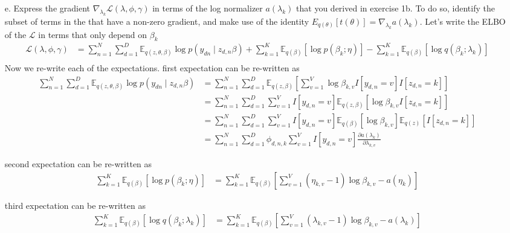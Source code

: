 \documentclass [12pt]{article}
\newcommand{\E}{\ensuremath{\mathbb{E}}}
\begin{document}
\begin{itemize}
\item[e.] Express the gradient $\nabla_{\lambda_k} \mathcal{L}(\lambda, \phi, \gamma)$ in terms of the log normalizer
    $a(\lambda_k)$ that you derived in exercise 1b. To do so, identify the subset of terms in the that have a non-zero
    gradient, and make use of the identity $E_{q(\theta)}[t(\theta)] = \nabla_{\lambda_k} a(\lambda_k)$. 
Let's write the ELBO of the $ \mathcal{L}$ in terms that only depend on $\beta_k$
\begin{align*}
    \mathcal{L}(\lambda, \phi, \gamma) &= \sum_{n=1}^N \sum_{d=1}^D \E_{q(z, \theta, \beta)}{ \log p(y_{dn} \mid z_{d,n} \beta)}  + \sum_{k=1}^K\E_{q(\beta)} \left[\log p(\beta_k ; \eta)\right] - \sum_{k=1}^K\E_{q(\beta)} \left[\log q(\beta_k ; \lambda_k)\right] \\
\end{align*}
Now we re-write each of the expectations.
first expectation can be re-written as
\begin{align*}
    \sum_{n=1}^N \sum_{d=1}^D \E_{q(z, \theta, \beta)}{ \log p(y_{dn} \mid z_{d,n} \beta)} &= \sum^N_{n=1} \sum^D_{d=1} \E_{q(z, \beta)}\left[ \sum^V_{v=1} \log \beta_{k,v} I[y_{d,n} = v]I[z_{d,n} = k]\right] \\
    &= \sum_{n=1}^{N} \sum_{d=1}^D
\sum_{v=1}^V I[y_{d,n} = v] \E_{q(z, \beta)} \left[\log \beta_{k,v} I[z_{d,n} = k] \right] \\
    &= \sum_{n=1}^{N} \sum_{d=1}^D
    \sum_{v=1}^V I[y_{d,n} = v] \E_{q( \beta)} \left[\log \beta_{k,v} \right]\E_{q(z)} \left[ I[z_{d,n} = k] \right] \\
    &= \sum_{n=1}^{N} \sum_{d=1}^D \phi_{d,n,k}
    \sum_{v=1}^V I[y_{d,n} = v] \frac{\partial a(\lambda_{k})}{\partial \lambda_{k,v}}
\end{align*}

second expectation can be re-written as
\begin{align*}
    \sum_{k=1}^K\E_{q(\beta)} \left[\log p(\beta_k ; \eta)\right] &= \sum_{k=1}^K \E_{q(\beta)} \left[\sum_{v=1}^V (\eta_{k,v} -1) \log \beta_{k,v} - a(\eta_k) \right]
\end{align*}

third expectation can be re-written as
\begin{align*}
    \sum_{k=1}^K\E_{q(\beta)} \left[\log q(\beta_k ; \lambda_k)\right] &= \sum_{k=1}^K \E_{q(\beta)}\left[ \sum_{v=1}^V (\lambda_{k,v} -1) \log \beta_{k,v} - a(\lambda_k)\right]
\end{align*}


\end{itemize}
\end{document}
